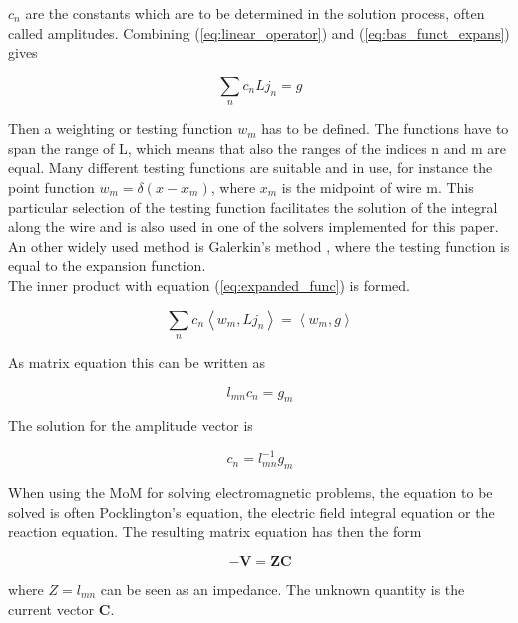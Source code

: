 \documentclass[a4paper,11pt]{article}
\begin{document}
$c_n$ are the constants which are to be determined in the solution process, often called amplitudes. Combining (\ref{eq:linear_operator}) and (\ref{eq:bas_funct_expans}) gives

\begin{equation}\label{eq:expanded_func}
 \sum_{n} c_n L j_n=g
\end{equation}

Then a weighting or testing function $w_m$ has to be defined. The functions have to span the range of L, which means that also the ranges of the indices n and m are equal. Many different testing functions are suitable and in use, for instance the point function $w_m=\delta(x-x_m)$, where $x_m$ is the midpoint of wire m. This particular selection of the testing function facilitates the solution of the integral along the wire and is also used in one of the solvers implemented for this paper. An other widely used method is Galerkin's method \cite{harrington}, where the testing function is equal to the expansion function.\\


The inner product with equation (\ref{eq:expanded_func}) is formed.

\begin{equation}
 \sum_{n} c_n \left\langle w_m, L j_n\right\rangle = \left\langle w_m, g \right\rangle
\end{equation}

As matrix equation this can be written as

\begin{equation}
 l_{mn}c_n=g_m
\end{equation}

The solution for the amplitude vector is

\begin{equation}
 c_n=l_{mn}^{-1}g_m
\end{equation}

When using the MoM for solving electromagnetic problems, the equation to be solved is often Pocklington's equation, the electric field integral equation or the reaction equation. The resulting matrix equation has then the form


\begin{equation}\label{eq:mom}
- \mathbf{V}=\mathbf{ZC}
\end{equation}

where $Z=l_{mn}$ can be seen as an impedance. The unknown quantity is the current vector $\mathbf{C}$. \\
\end{document}
